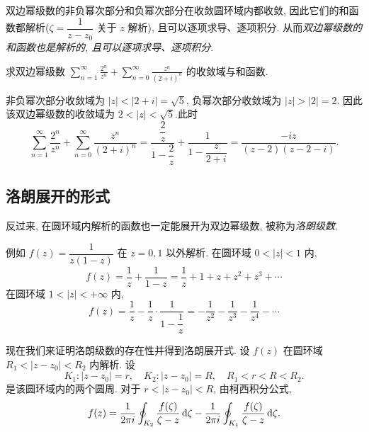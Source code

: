 双边幂级数的非负幂次部分和负幂次部分在收敛圆环域内都收敛,
因此它们的和函数都解析($\zeta=\dfrac1{z-z_0}$ 关于 $z$ 解析), 且可以逐项求导、逐项积分.
从而\emph{双边幂级数的和函数也是解析的, 且可以逐项求导、逐项积分}.

\begin{example}
	求双边幂级数 $\displaystyle\sum_{n=1}^\infty\frac{2^n}{z^n}+\sum_{n=0}^\infty\frac{z^n}{(2+i)^n}$ 的收敛域与和函数.
\end{example}

\begin{solution}
	非负幂次部分收敛域为 $|z|<|2+i|=\sqrt5$, 负幂次部分收敛域为 $|z|>|2|=2$.
	{因此该双边幂级数的收敛域为 $2<|z|<\sqrt5$.此时
		\[\sum_{n=1}^\infty\frac{2^n}{z^n}+\sum_{n=0}^\infty\frac{z^n}{(2+i)^n}
		=\frac{\dfrac 2z}{1-\dfrac 2z}+\frac1{1-\dfrac z{2+i}}
		=\frac{-iz}{(z-2)(z-2-i)}.\]}
\end{solution}

\subsection{洛朗展开的形式}

反过来, 在圆环域内解析的函数也一定能展开为双边幂级数, 被称为\emph{洛朗级数}.

例如 $f(z)=\dfrac1{z(1-z)}$ 在 $z=0,1$ 以外解析.
在圆环域 $0<|z|<1$ 内,
\[f(z)=\frac1z+\frac1{1-z}=\frac1z+1+z+z^2+z^3+\cdots\]
在圆环域 $1<|z|<+\infty$ 内,
\[f(z)=\frac1z-\frac1z\cdot\frac1{1-\dfrac1z}=-\frac1{z^2}-\frac1{z^3}-\frac1{z^4}-\cdots\]

现在我们来证明洛朗级数的存在性并得到洛朗展开式.
设 $f(z)$ 在圆环域 $R_1<|z-z_0|<R_2$ 内解析.
设
	\[K_1:|z-z_0|=r,\quad K_2:|z-z_0|=R,\quad R_1<r<R<R_2.\]
是该圆环域内的两个圆周. 
对于 $r<|z-z_0|<R$, 由柯西积分公式,
\[f(z)=\frac1{2\pi i}
	\oint_{K_2}\frac{f(\zeta)}{\zeta-z}\,\mathrm{d}\zeta
	-\frac1{2\pi i}\oint_{K_1}\frac{f(\zeta)}{\zeta-z}\,\mathrm{d}\zeta.\]

\begin{center}
\end{center}

